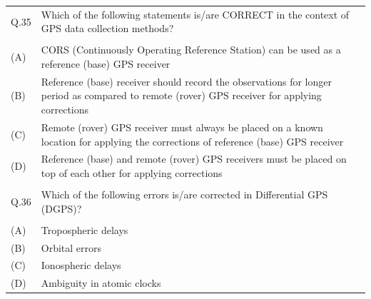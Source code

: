 \documentclass[12pt]{article}
\begin{document}
\begin{table}[H]
\renewcommand{\arraystretch}{3}
\setlength{\tabcolsep}{8pt}
\begin{tabular}{|l|p{15cm}|}
\hline
 & \\\hline
 
Q.35 &Which of the following statements is/are CORRECT in the context of GPS data
collection methods?\\ \hline 
 & \\ \hline
(A)&CORS (Continuously Operating Reference Station) can be used as a reference
(base) GPS receiver\\ \hline
(B)&Reference (base) receiver should record the observations for longer period as
compared to remote (rover) GPS receiver for applying corrections \\ \hline
(C)&Remote (rover) GPS receiver must always be placed on a known location for
applying the corrections of reference (base) GPS receiver\\ \hline
(D)&Reference (base) and remote (rover) GPS receivers must be placed on top of each
other for applying corrections\\ \hline
 & \\ \hline

Q.36 & Which of the following errors is/are corrected in Differential GPS (DGPS)?\\ \hline
 & \\ \hline
(A)&Tropospheric delays\\ \hline
(B)&Orbital errors\\ \hline
(C)&Ionospheric delays\\ \hline
(D)&Ambiguity in atomic clocks\\ \hline

 

\end{tabular}
\end{table}
\end{document}
